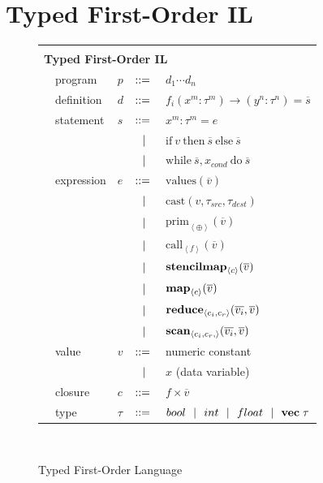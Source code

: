 \documentclass[preprint]{sigplanconf}
\begin{document}
\section{Typed First-Order IL}
\begin{figure}[h!]
  \begin{tabular}{| m{0.01cm}m{1.3cm}m{0.1cm}m{0.2cm}p{5.0cm} |}
  \hline
    & & & &\\
   \multicolumn{5}{|l|}{\textbf{Typed First-Order IL}}  \\[4pt]
  & program & $p$ &  $::=$   &  $d_1 \cdots d_n $ \\[4pt]
  & definition & $d$ & $::=$ & $f_i(x^m : \tau^m) \rightarrow (y^n : \tau^n) = \overline{s} $ \\[4pt]
  & statement  & $s$ & $::=$ & $x^m : \tau^m = e $\\[2pt]
  &            &     & $\ \ | \ \ $    & $\mathrm{if} ~v~ \mathrm{then} ~\overline{s}~ \mathrm{else} ~ \overline{s}$ \\[2pt]
  &            &     & $\ \ | \ \ $    & $\mathrm{while} ~ \overline{s}, x_{cond} ~ \mathrm{do} ~ \overline{s} ~  $ \\[4pt]
  & expression & $e$ & $::=$ & $\mathrm{values}(\overline{v})$ \\[2pt]
  &            &     & $\ \ | \ \ $    & $\mathrm{cast} (v, \tau_{src}, \tau_{dest})$ \\[2pt]
  &            &     & $\ \ | \ \ $    & $\mathrm{prim}_{\left\langle \oplus \right\rangle }(\overline{v})$ \\[2pt]
  &            &     & $\ \ | \ \ $    & $\mathrm{call}_{\left\langle f  \right\rangle } (\overline{v})$ \\[2pt] 
  &            &     & $\ \ | \ \ $    & $\mathbf{stencil} \mbox{\textbf{map}} _{\left\langle c \right\rangle}(\overline{v})$ \\[2pt]
  
  &            &     & $\ \ | \ \ $    & $\mbox{\textbf{map}} _{\left\langle c \right\rangle}(\overline{v})$ \\[2pt]
  &            &     & $\ \ | \ \ $    & $\mbox{\textbf{reduce}} _{ \left\langle c_i, c_r \right\rangle } (\overline{v_i}, \overline{v})$ \\[2pt]
  &            &     & $\ \ | \ \ $    & $\mbox{\textbf{scan}} _{ \left\langle c_i, c_r, \right\rangle} (\overline{v_i}, \overline{v})$ \\[5pt]
  & value      & $v$ & $::=$ & numeric constant \\[2pt]
  &            &     & $\ \ | \ \ $    &  $x$  \quad \small{(data variable)} \\[2pt]
  & closure    & $c$ & $::=$ & $f \times \overline{v}$ \\[4pt]
  & type & $\tau$    & $::=$ & $bool \ \ | \ \  int \ \ | \ \  float \ \ | \ \  \mathbf{vec} \; \tau   $\\[5pt]
  \hline
  \end{tabular}\\[4pt]
  \caption{Typed First-Order Language}
\end{figure} 
\end{document}
